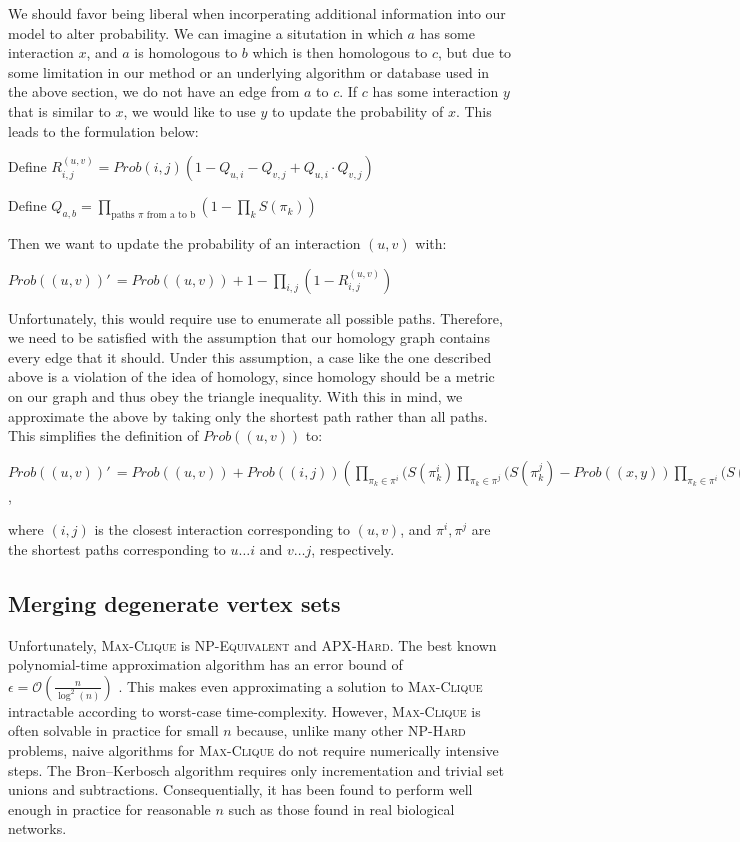 \documentclass[12pt,twoside]{article}
\def\NI{\noindent}
\begin{document}
\NI We should favor being liberal when incorperating additional information into our model to alter probability. We can imagine a situtation in which $a$ has some interaction $x$, and $a$ is homologous to $b$ which is then homologous to $c$, but due to some limitation in our method or an underlying algorithm or database used in the above section, we do not have an edge from $a$ to $c$. If $c$ has some interaction $y$ that is similar to $x$, we would like to use $y$ to update the probability of $x$. This leads to the formulation below:

\NI Define
$R_{i,j}^{(u,v)} = Prob(i,j) \left(1 - \displaystyle Q_{u,i} - Q_{v,j} + Q_{u,i} \cdot Q_{v,j} \right)$

\NI Define $Q_{a,b} = \displaystyle \prod_{\text{paths } \pi \text{ from a to b}} \left( 1 - \prod_{k} S(\pi_k) \right)$

\NI Then we want to update the probability of an interaction $(u,v)$ with:

\NI $Prob((u,v))'\,\! = Prob((u,v)) + 1 - \displaystyle \prod_{i,j}(1 - R_{i,j}^{(u,v)})$

\NI Unfortunately, this would require use to enumerate all possible paths. Therefore, we need to be satisfied with the assumption that our homology graph contains every edge that it should. Under this assumption, a case like the one described above is a violation of the idea of homology, since homology should be a metric on our graph and thus obey the triangle inequality. With this in mind, we approximate the above by taking only the shortest path rather than all paths. This simplifies the definition of $Prob((u,v))$ to:

\NI $Prob((u,v))'\,\! = Prob((u,v)) + \displaystyle Prob((i,j)) \left( \prod_{\pi_k \in \pi^i}(S(\pi_k^i) \prod_{\pi_k \in \pi^j}(S(\pi_k^j) - Prob((x,y)) \prod_{\pi_k \in \pi^i}(S(\pi_k^i) \prod_{\pi_k \in \pi^j}(S(\pi_k^j) \right)$,

\NI where $(i,j)$ is the closest interaction corresponding to $(u,v)$, and $\pi^i, \pi^j$ are the shortest paths corresponding to $u \ldots i$ and $v \ldots j$, respectively.

\subsection{Merging degenerate vertex sets}

\NI Unfortunately, \textsc{Max-Clique} is \textsc{NP-Equivalent} and \textsc{APX-Hard}. The best known polynomial-time approximation algorithm has an error bound of $\epsilon = \mathcal O \left(\frac{n}{\log^2(n)}\right)$ \cite{boppana}. This makes even approximating a solution to \textsc{Max-Clique} intractable according to worst-case time-complexity. However, \textsc{Max-Clique} is often solvable in practice for small $n$ because, unlike many other \textsc{NP-Hard} problems, naive algorithms for \textsc{Max-Clique} do not require numerically intensive steps. The Bron--Kerbosch algorithm requires only incrementation and trivial set unions and subtractions. Consequentially, it has been found to perform well enough in practice for reasonable $n$ such as those found in real biological networks.
\end{document}
